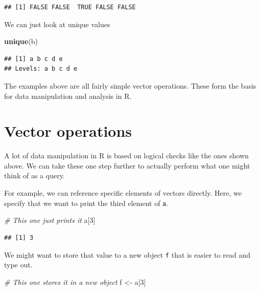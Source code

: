 \documentclass[
]{book}
\newenvironment{Shaded}{\begin{snugshade}}{\end{snugshade}}
\newcommand{\CommentTok}[1]{\textcolor[rgb]{0.56,0.35,0.01}{\textit{#1}}}
\newcommand{\DecValTok}[1]{\textcolor[rgb]{0.00,0.00,0.81}{#1}}
\newcommand{\KeywordTok}[1]{\textcolor[rgb]{0.13,0.29,0.53}{\textbf{#1}}}
\newcommand{\NormalTok}[1]{#1}
\newcommand{\StringTok}[1]{\textcolor[rgb]{0.31,0.60,0.02}{#1}}
\begin{document}
\begin{verbatim}
## [1] FALSE FALSE  TRUE FALSE FALSE
\end{verbatim}

We can just look at unique values

\begin{Shaded}
\begin{Highlighting}[]
\KeywordTok{unique}\NormalTok{(b)}
\end{Highlighting}
\end{Shaded}

\begin{verbatim}
## [1] a b c d e
## Levels: a b c d e
\end{verbatim}

The examples above are all fairly simple vector operations. These form the basis for data manipulation and analysis in R.

\hypertarget{operations}{%
\section{Vector operations}\label{operations}}

A lot of data manipulation in R is based on logical checks like the ones shown above. We can take these one step further to actually perform what one might think of as a query.

For example, we can reference specific elements of vectors directly. Here, we specify that we want to print the third element of \texttt{a}.

\begin{Shaded}
\begin{Highlighting}[]
\CommentTok{# This one just prints it}
\NormalTok{a[}\DecValTok{3}\NormalTok{]}
\end{Highlighting}
\end{Shaded}

\begin{verbatim}
## [1] 3
\end{verbatim}

We might want to store that value to a new object \texttt{f} that is easier to read and type out.

\begin{Shaded}
\begin{Highlighting}[]
\CommentTok{# This one stores it in a new object}
\NormalTok{f <-}\StringTok{ }\NormalTok{a[}\DecValTok{3}\NormalTok{]}
\end{Highlighting}
\end{Shaded}
\end{document}
